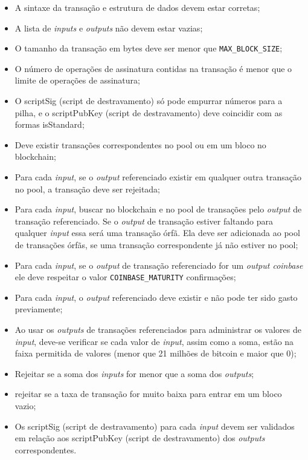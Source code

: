 \documentclass[conference,compsoc]{IEEEtran}
\begin{document}
\begin{itemize}
\item A sintaxe da transação e estrutura de dados devem estar corretas;
\item A lista de \textit{inputs} e \textit{outputs} não devem estar vazias;
\item O tamanho da transação em bytes deve ser menor que \texttt{MAX\_BLOCK\_SIZE};
\item O número de operações de assinatura contidas na transação é menor que o limite de operações de assinatura;
\item O scriptSig (script de destravamento) só pode empurrar números para a pilha, e o scriptPubKey (script de destravamento) deve coincidir com as formas isStandard;
\item Deve existir transações correspondentes no pool ou em um bloco no blockchain;
\item Para cada \textit{input}, se o \textit{output} referenciado existir em qualquer outra transação no pool, a transação deve ser rejeitada;
\item Para cada \textit{input}, buscar no blockchain e no pool de transações pelo \textit{output} de transação referenciado. Se o \textit{output} de transação estiver faltando para qualquer \textit{input} essa será uma transação órfã. Ela deve ser adicionada ao pool de transações órfãs, se uma transação correspondente já não estiver no pool;
\item Para cada \textit{input}, se o \textit{output} de transação referenciado for um \textit{output coinbase} ele deve respeitar o valor \texttt{COINBASE\_MATURITY} confirmações;
\item Para cada \textit{input}, o \textit{output} referenciado deve existir e não pode ter sido gasto previamente;
\item Ao usar os \textit{outputs} de transações referenciados para administrar os valores de \textit{input}, deve-se verificar se cada valor de \textit{input}, assim como a soma, estão na faixa permitida de valores (menor que 21 milhões de bitcoin e maior que 0);
\item Rejeitar se a soma dos \textit{inputs} for menor que a soma dos \textit{outputs};
\item rejeitar se a taxa de transação for muito baixa para entrar em um bloco vazio;
\item Os scriptSig (script de destravamento) para cada \textit{input} devem ser validados em relação aos scriptPubKey (script de destravamento) dos \textit{outputs} correspondentes.
\end{itemize}
\end{document}
